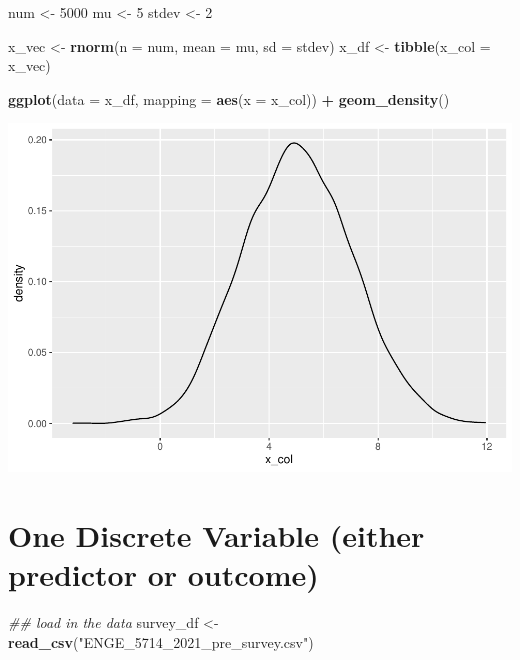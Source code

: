 \documentclass[
]{book}
\newenvironment{Shaded}{\begin{snugshade}}{\end{snugshade}}
\newcommand{\CommentTok}[1]{\textcolor[rgb]{0.56,0.35,0.01}{\textit{#1}}}
\newcommand{\DataTypeTok}[1]{\textcolor[rgb]{0.13,0.29,0.53}{#1}}
\newcommand{\DecValTok}[1]{\textcolor[rgb]{0.00,0.00,0.81}{#1}}
\newcommand{\KeywordTok}[1]{\textcolor[rgb]{0.13,0.29,0.53}{\textbf{#1}}}
\newcommand{\NormalTok}[1]{#1}
\newcommand{\OperatorTok}[1]{\textcolor[rgb]{0.81,0.36,0.00}{\textbf{#1}}}
\newcommand{\StringTok}[1]{\textcolor[rgb]{0.31,0.60,0.02}{#1}}
\begin{document}
\begin{Shaded}
\begin{Highlighting}[]
\NormalTok{num \textless{}{-}}\StringTok{ }\DecValTok{5000}
\NormalTok{mu \textless{}{-}}\StringTok{ }\DecValTok{5}
\NormalTok{stdev \textless{}{-}}\StringTok{ }\DecValTok{2}

\NormalTok{x\_vec \textless{}{-}}\StringTok{ }\KeywordTok{rnorm}\NormalTok{(}\DataTypeTok{n =}\NormalTok{ num, }\DataTypeTok{mean =}\NormalTok{ mu, }\DataTypeTok{sd =}\NormalTok{ stdev)}
\NormalTok{x\_df \textless{}{-}}\StringTok{ }\KeywordTok{tibble}\NormalTok{(}\DataTypeTok{x\_col =}\NormalTok{ x\_vec)}



\KeywordTok{ggplot}\NormalTok{(}\DataTypeTok{data =}\NormalTok{ x\_df, }\DataTypeTok{mapping =} \KeywordTok{aes}\NormalTok{(}\DataTypeTok{x =}\NormalTok{ x\_col)) }\OperatorTok{+}
\StringTok{  }\KeywordTok{geom\_density}\NormalTok{()}
\end{Highlighting}
\end{Shaded}

\includegraphics{test_course_notes_files/figure-latex/unnamed-chunk-14-1.pdf}

\hypertarget{one-discrete-variable-either-predictor-or-outcome}{%
\section{One Discrete Variable (either predictor or outcome)}\label{one-discrete-variable-either-predictor-or-outcome}}

\begin{Shaded}
\begin{Highlighting}[]
\CommentTok{\#\# load in the data}
\NormalTok{survey\_df \textless{}{-}}\StringTok{ }\KeywordTok{read\_csv}\NormalTok{(}\StringTok{"ENGE\_5714\_2021\_pre\_survey.csv"}\NormalTok{)}
\end{Highlighting}
\end{Shaded}
\end{document}
